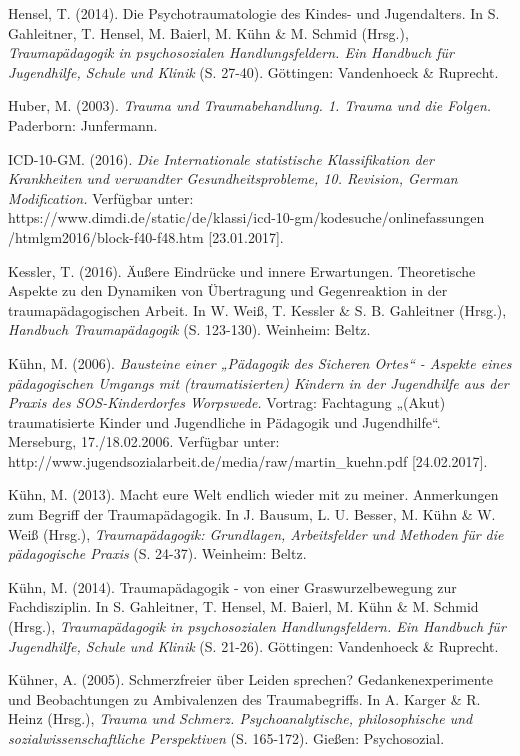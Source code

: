 \hang
Hensel, T. (2014). Die Psychotraumatologie des Kindes- und Jugendalters. In S. Gahleitner, T. Hensel, M. Baierl, M. K{\"u}hn \& M. Schmid (Hrsg.), \textit{Traumap{\"a}dagogik in psychosozialen Handlungsfeldern. Ein Handbuch f{\"u}r Jugendhilfe, Schule und Klinik} (S. 27-40). Göttingen: Vandenhoeck \& Ruprecht.

\hang
Huber, M. (2003). \textit{Trauma und Traumabehandlung. 1. Trauma und die Folgen.} Paderborn: Junfermann.

\hang
ICD-10-GM. (2016). \textit{Die Internationale statistische Klassifikation der Krankheiten und verwandter Gesundheitsprobleme, 10. Revision, German Modification.} Verfügbar unter:\\ https://www.dimdi.de/static/de/klassi/icd-10-gm/kodesuche/onlinefassungen\\
/htmlgm2016/block-f40-f48.htm [23.01.2017].

\hang
Kessler, T. (2016). {\"A}ußere Eindr{\"u}cke und innere Erwartungen. Theoretische Aspekte zu den Dynamiken von {\"U}bertragung und Gegenreaktion in der traumap{\"a}dagogischen Arbeit. In W. Weiß, T. Kessler \& S. B. Gahleitner (Hrsg.), \textit{Handbuch Traumapädagogik} (S. 123-130). Weinheim: Beltz.

\hang
Kühn, M. (2006). \textit{Bausteine einer „P{\"a}dagogik des Sicheren Ortes“ - Aspekte eines p{\"a}dagogischen Umgangs mit (traumatisierten) Kindern in der Jugendhilfe aus der Praxis des SOS-Kinderdorfes Worpswede.} Vortrag: Fachtagung „(Akut) traumatisierte Kinder und Jugendliche in P{\"a}dagogik und Jugendhilfe“. Merseburg, 17./18.02.2006. Verfügbar unter:\\ http://www.jugendsozialarbeit.de/media/raw/martin\_kuehn.pdf [24.02.2017].

\hang
Kühn, M. (2013). Macht eure Welt endlich wieder mit zu meiner. Anmerkungen zum Begriff der Traumapädagogik. In J. Bausum, L. U. Besser, M. Kühn \& W. Weiß (Hrsg.), \textit{Traumapädagogik: Grundlagen, Arbeitsfelder und Methoden für die pädagogische Praxis} (S. 24-37). Weinheim: Beltz.

\hang
Kühn, M. (2014). Traumap{\"a}dagogik - von einer Graswurzelbewegung zur Fachdisziplin. In S. Gahleitner, T. Hensel, M. Baierl, M. K{\"u}hn \& M. Schmid (Hrsg.), \textit{Traumap{\"a}dagogik in psychosozialen Handlungsfeldern. Ein Handbuch f{\"u}r Jugendhilfe, Schule und Klinik} (S. 21-26). Göttingen: Vandenhoeck \& Ruprecht.

\hang
K{\"u}hner, A. (2005). Schmerzfreier {\"u}ber Leiden sprechen? Gedankenexperimente und Beobachtungen zu Ambivalenzen des Traumabegriffs. In A. Karger \& R. Heinz (Hrsg.), \textit{Trauma und Schmerz. Psychoanalytische, philosophische und sozialwissenschaftliche Perspektiven} (S. 165-172). Gießen: Psychosozial.

